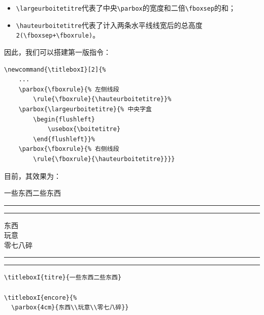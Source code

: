 \begin{itemize}
    \item \verb|\largeurboitetitre|代表了中央\verb|\parbox|的宽度和二倍\verb|\fboxsep|的和；
    \item \verb|\hauteurboitetitre|代表了计入两条水平线线宽后的总高度\verb|2(\fboxsep+\fboxrule)|。
\end{itemize}

因此，我们可以搭建第一版指令：

\begin{dmd}
\begin{verbatim}
\newcommand{\titleboxI}[2]{% 
    ...
    \parbox{\fboxrule}{% 左侧线段
        \rule{\fboxrule}{\hauteurboitetitre}}%
    \parbox{\largeurboitetitre}{% 中央字盒
        \begin{flushleft}
            \usebox{\boitetitre} 
        \end{flushleft}}%
    \parbox{\fboxrule}{% 右侧线段
        \rule{\fboxrule}{\hauteurboitetitre}}}}\end{verbatim}
\end{dmd}

\newcommand{\titleboxI}[2]{%
  \begin{lrbox}{\boitetitre}%
    \kern\fboxsep#2\kern\fboxsep
  \end{lrbox}
  \settowidth{\largeurboitetitre}{\usebox{\boitetitre}}%
  \settoheight{\hauteurboitetitre}{\usebox{\boitetitre}}%
  \settodepth{\tempdim}{\usebox{\boitetitre}}%
  \addtolength{\hauteurboitetitre}{\tempdim+2\fboxrule+2\fboxsep}%
  \parbox{\fboxrule}{%
    \rule{\fboxrule}{\hauteurboitetitre}}%
  \parbox{\largeurboitetitre}{%
    \begin{flushleft}
      \usebox{\boitetitre}
    \end{flushleft}}%
  \parbox{\fboxrule}{%
    \rule{\fboxrule}{\hauteurboitetitre}}}

目前，其效果为：

\begin{codelist}[10.19]{
    \titleboxI{titre}{一些东西二些东西}

\titleboxI{encore}{%
  \parbox{4cm}{东西\\玩意\\零七八碎}}
}
\begin{verbatim}
\titleboxI{titre}{一些东西二些东西}

\titleboxI{encore}{%
  \parbox{4cm}{东西\\玩意\\零七八碎}}\end{verbatim}
\end{codelist}


